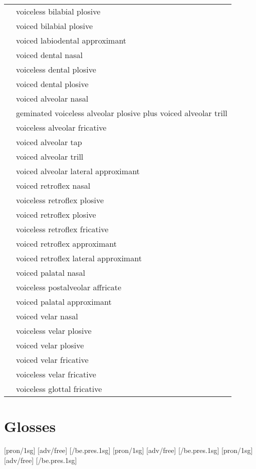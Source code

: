 \documentclass{article}
\begin{document}
\begin{xltabular}{\textwidth}{lL}
   & voiceless bilabial plosive \\
   & voiced bilabial plosive \\
   & voiced labiodental approximant \\
   & voiced dental nasal \\
   & voiceless dental plosive \\
   & voiced dental plosive \\
   & voiced alveolar nasal \\
   & geminated voiceless alveolar plosive plus voiced alveolar trill \\
   & voiceless alveolar fricative \\
   & voiced alveolar tap \\
   & voiced alveolar trill \\
   & voiced alveolar lateral approximant \\
   & voiced retroflex nasal \\
   & voiceless retroflex plosive \\
   & voiced retroflex plosive \\
   & voiceless retroflex fricative \\
   & voiced retroflex approximant \\
   & voiced retroflex lateral approximant \\
  \ipa{\textltailn} & voiced palatal nasal \\
  \ipa{\t{\textteshlig}} & voiceless postalveolar affricate \\
   & voiced palatal approximant \\
   & voiced velar nasal \\
   & voiceless velar plosive \\
   & voiced velar plosive \\
   & voiced velar fricative \\
   & voiceless velar fricative \\
   & voiceless glottal fricative \\
\end{xltabular}

\newpage\section{Glosses}

\pex[lingstyle=custom_nlevel, labeltype=numeric]
\a \begingl
{}[pron/{\sc 1sg}]
[adv/free]
[/be.{\sc pres.1sg}]
\endgl
\a \begingl
{}[pron/{\sc 1sg}]
[adv/free]
[/be.{\sc pres.1sg}]
\endgl
\a \begingl
{}[pron/{\sc 1sg}]
[adv/free]
[/be.{\sc pres.1sg}]
\endgl
\xe
\end{document}
